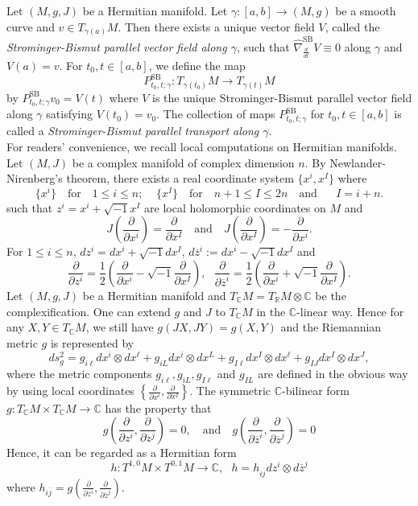 \documentclass[12pt, reqno]{amsart}
\theoremstyle{plain}
\theoremstyle{definition}
\newcommand{\sq}{\sqrt{-1}}
\newcommand{\p}{\partial}
\renewcommand{\bar}{\overline}
\newcommand{\beq}{\begin{equation}}
\newcommand{\eeq}{\end{equation}}
\renewcommand{\hat}{\widehat}
\newcommand{\qtq}[1]{\quad\mbox{#1}\quad}
\newcommand{\ts}{\otimes}
\renewcommand{\>}{\rightarrow}
\newcommand{\C}{{\mathbb C}}
\newcommand{\R}{{\mathbb R}}
\renewcommand{\>}{\rightarrow}
\renewcommand{\p}{{\partial}}
\numberwithin{equation}{section} %
\begin{document}
   Let $(M,g,J)$ be a Hermitian manifold.
   Let $\gamma:[a,b]\to(M,g)$ be a smooth curve and $v\in T_{\gamma(a)}M$. Then there exists a unique vector field $V$,
   called the \emph{Strominger-Bismut parallel vector field along $\gamma$}, such that $\hat{\nabla}_{\frac{d}{dt}}^\text{SB}V\equiv 0$ along $\gamma$ and $V(a)=v$.
   For $t_0,t\in [a,b]$,  we define the map
   \beq
   P_{t_0,t;\gamma}^{\text{SB}}:T_{\gamma(t_0)}M\to T_{\gamma(t)}M
   \eeq
   by $P_{t_0,t;\gamma}^{\text{SB}}v_0=V(t)$ where $V$ is the unique Strominger-Bismut parallel vector field along $\gamma$ satisfying $V(t_0)=v_0$.
   The collection of maps $P_{t_0,t;\gamma}^{\text{SB}}$ for $t_0,t\in [a,b]$ is called a \emph{Strominger-Bismut parallel transport along $\gamma$}.\\





For readers' convenience, we recall  local computations on Hermitian manifolds.     Let $(M,J)$ be a complex manifold of complex dimension  $n$. By
Newlander-Nirenberg's theorem, there exists a real coordinate system
$\{x^i,x^I\}$ where
$$
\{x^i\} \qtq{for} 1\leq i\leq n;\ \ \ \ \  \{x^I\} \qtq{for} n+1\leq
I\leq 2n \qtq{and}\ \ \ I=i+n.$$
such that $z^i=x^i+\sq x^I$ are  local holomorphic
coordinates on $M$ and
$$
J\left(\frac{\p}{\p x^i}\right)=\frac{\p}{\p x^I} \qtq{and}
J\left(\frac{\p}{\p x^I}\right)=-\frac{\p}{\p x^i}.$$
For $1\leq i\leq n$, $ dz^i=dx^i+\sq dx^I$, $d\bar z^i:=dx^i-\sq dx^I$
and  $$ \frac{\p}{\p
	z^i}=\frac{1}{2}\left(\frac{\p}{\p x^i}-\sq \frac{\p}{\p
	x^I}\right),\ \ \ \frac{\p}{\p\bar
	z^i}=\frac{1}{2}\left(\frac{\p}{\p x^i}+\sq \frac{\p}{\p
	x^I}\right).$$
Let $(M,g, J)$ be a Hermitian manifold and  $T_\C M=T_\R M\ts \C$
be the complexification. One can extend  $g$ and $J$ to
$T_\C M$ in the $\C$-linear way. Hence for any $X,Y\in T_\C M$, we
still have $ g(JX,JY)=g(X,Y)$  and  the Riemannian metric $g$ is represented
by
$$ds_g^2=g_{i\ell}dx^i\ts dx^\ell+g_{iL}dx^i\ts dx^L+g_{I\ell} dx^I\ts dx^\ell+g_{IJ}dx^I\ts dx^J,$$
where the metric components $g_{i\ell}, g_{iL}, g_{I\ell}$ and
$g_{IL}$ are defined in the obvious way by using local  coordinates $\left\{\frac{\p}{\p x^i}, \frac{\p}{\p x^I}\right\}$. The symmetric $\C$-bilinear  form $g:T_\C M\times T_\C M\>\C$ has the property that $$ g\left(\frac{\p}{\p
	z^i},\frac{\p}{\p z^j}\right)=0, \qtq{and} g\left(\frac{\p}{\p \bar z^i},\frac{\p}{\p \bar
	z^j}\right)=0$$ Hence, it can be regarded  as a Hermitian form  $$h: T^{1,0}M\times T^{0,1}M\>\C,\ \ \ h=h_{i\bar j}dz^i\ts d\bar z^j$$ where $h_{i\bar j}=g\left(\frac{\p}{\p
	z^i},\frac{\p}{\p \bar z^j}\right)$.\\
\end{document}
